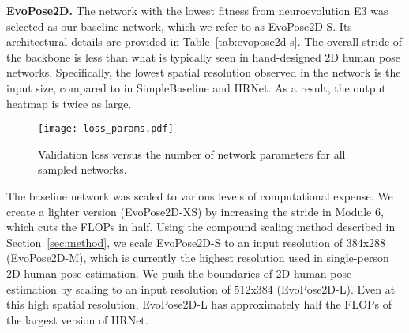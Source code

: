 \documentclass[final]{cvpr}
\begin{document}
\medskip\noindent\textbf{EvoPose2D.} The network with the lowest fitness from neuroevolution E3 was selected as our baseline network, which we refer to as EvoPose2D-S. Its architectural details are provided in Table~\ref{tab:evopose2d-s}. The overall stride of the backbone is less than what is typically seen in hand-designed 2D human pose networks. Specifically, the lowest spatial resolution observed in the network is  the input size, compared to  in SimpleBaseline and HRNet. As a result, the output heatmap is twice as large.

\begin{figure}
\centering
\vspace{-8pt}
    \texttt{[image: loss\_params.pdf]}
\caption{Validation loss versus the number of network parameters for all sampled networks.}
\label{fig:loss_params}
\end{figure}

The baseline network was scaled to various levels of computational expense. We create a lighter version (EvoPose2D-XS) by increasing the stride in Module 6, which cuts the FLOPs in half. Using the compound scaling method described in Section~\ref{sec:method}, we scale EvoPose2D-S to an input resolution of 384x288 (EvoPose2D-M), which is currently the highest resolution used in single-person 2D human pose estimation. We push the boundaries of 2D human pose estimation by scaling to an input resolution of 512x384 (EvoPose2D-L). Even at this high spatial resolution, EvoPose2D-L has approximately half the FLOPs of the largest version of HRNet. 
\end{document}
